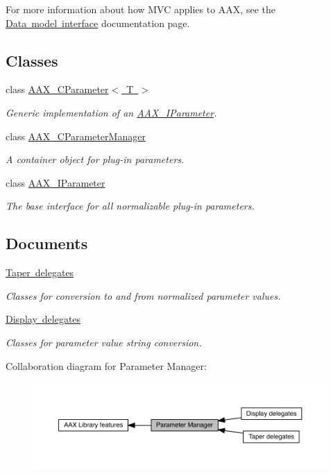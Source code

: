 For more information about how M\+VC applies to A\+AX, see the \mbox{\hyperlink{a00798}{Data model interface}} documentation page. \subsection*{Classes}
\begin{DoxyCompactItemize}
\item 
class \mbox{\hyperlink{a01537}{A\+A\+X\+\_\+\+C\+Parameter$<$ T $>$}}
\begin{DoxyCompactList}\small\item\em Generic implementation of an \mbox{\hyperlink{a01857}{A\+A\+X\+\_\+\+I\+Parameter}}. \end{DoxyCompactList}\item 
class \mbox{\hyperlink{a01545}{A\+A\+X\+\_\+\+C\+Parameter\+Manager}}
\begin{DoxyCompactList}\small\item\em A container object for plug-\/in parameters. \end{DoxyCompactList}\item 
class \mbox{\hyperlink{a01857}{A\+A\+X\+\_\+\+I\+Parameter}}
\begin{DoxyCompactList}\small\item\em The base interface for all normalizable plug-\/in parameters. \end{DoxyCompactList}\end{DoxyCompactItemize}
\subsection*{Documents}
\begin{DoxyCompactItemize}
\item 
\mbox{\hyperlink{a00815}{Taper delegates}}
\begin{DoxyCompactList}\small\item\em Classes for conversion to and from normalized parameter values. \end{DoxyCompactList}\item 
\mbox{\hyperlink{a00816}{Display delegates}}
\begin{DoxyCompactList}\small\item\em Classes for parameter value string conversion. \end{DoxyCompactList}\end{DoxyCompactItemize}
Collaboration diagram for Parameter Manager\+:
\nopagebreak
\begin{figure}[H]
\begin{center}
\leavevmode
\includegraphics[width=350pt]{a00814}
\end{center}
\end{figure}
